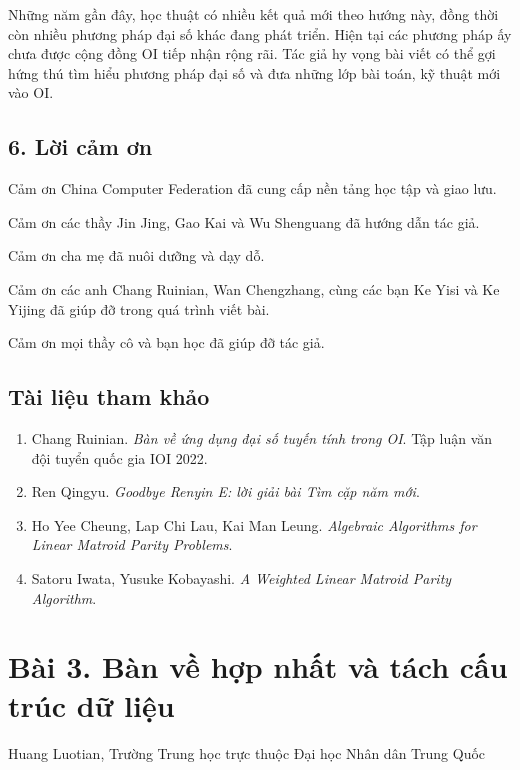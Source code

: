 \documentclass[11pt]{article}
\begin{document}
Những năm gần đây, học thuật có nhiều kết quả mới theo hướng này, đồng thời còn
nhiều phương pháp đại số khác đang phát triển. Hiện tại các phương pháp ấy chưa
được cộng đồng OI tiếp nhận rộng rãi. Tác giả hy vọng bài viết có thể gợi hứng
thú tìm hiểu phương pháp đại số và đưa những lớp bài toán, kỹ thuật mới vào OI.

\subsection*{6. Lời cảm ơn}

Cảm ơn China Computer Federation đã cung cấp nền tảng học tập và giao lưu.

Cảm ơn các thầy Jin Jing, Gao Kai và Wu Shenguang đã hướng dẫn tác giả.

Cảm ơn cha mẹ đã nuôi dưỡng và dạy dỗ.

Cảm ơn các anh Chang Ruinian, Wan Chengzhang, cùng các bạn Ke Yisi và Ke Yijing
đã giúp đỡ trong quá trình viết bài.

Cảm ơn mọi thầy cô và bạn học đã giúp đỡ tác giả.

\subsection*{Tài liệu tham khảo}

\begin{enumerate}
  \item Chang Ruinian. \emph{Bàn về ứng dụng đại số tuyến tính trong OI}. Tập
  luận văn đội tuyển quốc gia IOI 2022.
  \item Ren Qingyu. \emph{Goodbye Renyin E: lời giải bài Tìm cặp năm mới}.
  \item Ho Yee Cheung, Lap Chi Lau, Kai Man Leung. \emph{Algebraic Algorithms
  for Linear Matroid Parity Problems}.
  \item Satoru Iwata, Yusuke Kobayashi. \emph{A Weighted Linear Matroid Parity
  Algorithm}.
\end{enumerate}

\section*{Bài 3. Bàn về hợp nhất và tách cấu trúc dữ liệu}

\begin{center}
Huang Luotian, Trường Trung học trực thuộc Đại học Nhân dân Trung Quốc
\end{center}
\end{document}
